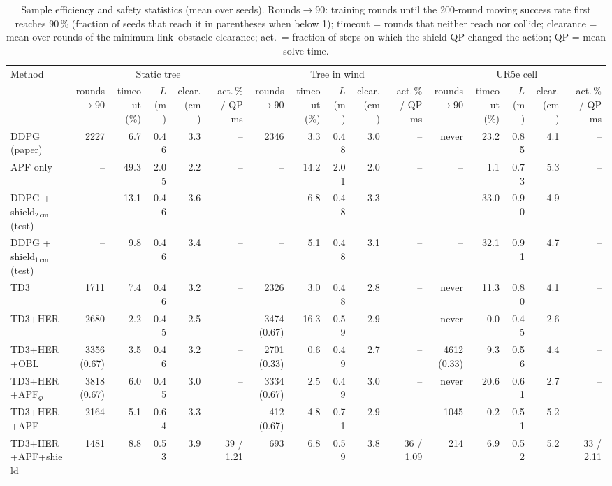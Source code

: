 \begin{table}[t]
\centering
\caption{Sample efficiency and safety statistics (mean over seeds). Rounds$\to$90: training rounds until the 200-round moving success rate first reaches 90\,\% (fraction of seeds that reach it in parentheses when below 1); timeout = rounds that neither reach nor collide; clearance = mean over rounds of the minimum link--obstacle clearance; act.\ = fraction of steps on which the shield QP changed the action; QP = mean solve time.}
\label{tab:eff}
\scriptsize
\setlength{\tabcolsep}{3pt}
\begin{tabular}{lrrrrrrrrrrrrrrr}
\toprule
Method & \multicolumn{5}{c}{Static tree} & \multicolumn{5}{c}{Tree in wind} & \multicolumn{5}{c}{UR5e cell} \\
 & rounds$\to$90 & timeout (\%) & $L$ (m) & clear.\ (cm) & act.\,\% / QP ms & rounds$\to$90 & timeout (\%) & $L$ (m) & clear.\ (cm) & act.\,\% / QP ms & rounds$\to$90 & timeout (\%) & $L$ (m) & clear.\ (cm) & act.\,\% / QP ms \\
\midrule
DDPG (paper) & 2227 & 6.7 & 0.46 & 3.3 & -- & 2346 & 3.3 & 0.48 & 3.0 & -- & never & 23.2 & 0.85 & 4.1 & -- \\
APF only & -- & 49.3 & 2.05 & 2.2 & -- & -- & 14.2 & 2.01 & 2.0 & -- & -- & 1.1 & 0.73 & 5.3 & -- \\
DDPG + shield$_{2\,\mathrm{cm}}$ (test) & -- & 13.1 & 0.46 & 3.6 & -- & -- & 6.8 & 0.48 & 3.3 & -- & -- & 33.0 & 0.90 & 4.9 & -- \\
DDPG + shield$_{1\,\mathrm{cm}}$ (test) & -- & 9.8 & 0.46 & 3.4 & -- & -- & 5.1 & 0.48 & 3.1 & -- & -- & 32.1 & 0.91 & 4.7 & -- \\
TD3 & 1711 & 7.4 & 0.46 & 3.2 & -- & 2326 & 3.0 & 0.48 & 2.8 & -- & never & 11.3 & 0.80 & 4.1 & -- \\
TD3+HER & 2680 & 2.2 & 0.45 & 2.5 & -- & 3474 (0.67) & 16.3 & 0.59 & 2.9 & -- & never & 0.0 & 0.45 & 2.6 & -- \\
TD3+HER+OBL & 3356 (0.67) & 3.5 & 0.46 & 3.2 & -- & 2701 (0.33) & 0.6 & 0.49 & 2.7 & -- & 4612 (0.33) & 9.3 & 0.56 & 4.4 & -- \\
TD3+HER+APF$_\Phi$ & 3818 (0.67) & 6.0 & 0.45 & 3.0 & -- & 3334 (0.67) & 2.5 & 0.49 & 3.0 & -- & never & 20.6 & 0.61 & 2.7 & -- \\
TD3+HER+APF & 2164 & 5.1 & 0.64 & 3.3 & -- & 412 (0.67) & 4.8 & 0.71 & 2.9 & -- & 1045 & 0.2 & 0.51 & 5.2 & -- \\
TD3+HER+APF+shield & 1481 & 8.8 & 0.53 & 3.9 & 39 / 1.21 & 693 & 6.8 & 0.59 & 3.8 & 36 / 1.09 & 214 & 6.9 & 0.52 & 5.2 & 33 / 2.11 \\

\end{tabular}
\end{table}
